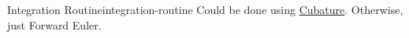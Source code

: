 \begin{definition}{Integration Routine}{integration-routine}
  Could be done using
  \href{https://github.com/JuliaMath/Cubature.jl}{Cubature}. Otherwise,
  just Forward Euler.
\end{definition}
